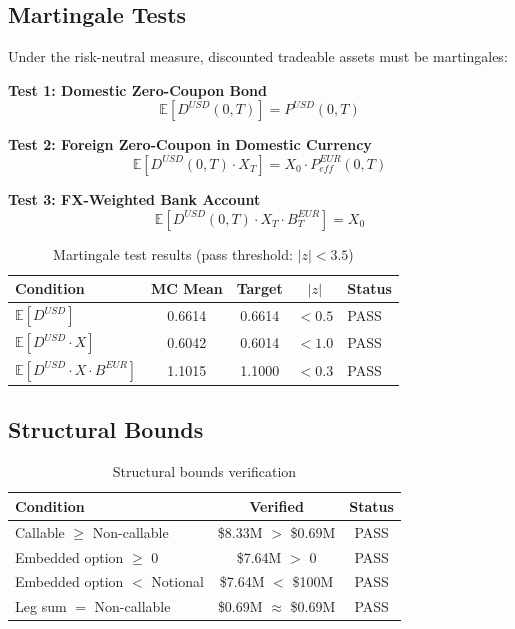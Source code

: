 \documentclass[10pt,a4paper]{article}
\begin{document}
\subsection{Martingale Tests}

Under the risk-neutral measure, discounted tradeable assets must be martingales:

\textbf{Test 1: Domestic Zero-Coupon Bond}
\[
\mathbb{E}[D^{USD}(0,T)] = P^{USD}(0,T)
\]

\textbf{Test 2: Foreign Zero-Coupon in Domestic Currency}
\[
\mathbb{E}[D^{USD}(0,T) \cdot X_T] = X_0 \cdot P^{EUR}_{eff}(0,T)
\]

\textbf{Test 3: FX-Weighted Bank Account}
\[
\mathbb{E}[D^{USD}(0,T) \cdot X_T \cdot B^{EUR}_T] = X_0
\]

\begin{table}[H]
\centering
\begin{tabular}{lcccl}
\toprule
\textbf{Condition} & \textbf{MC Mean} & \textbf{Target} & $|z|$ & \textbf{Status} \\
\midrule
$\mathbb{E}[D^{USD}]$ & 0.6614 & 0.6614 & $<0.5$ & PASS \\
$\mathbb{E}[D^{USD} \cdot X]$ & 0.6042 & 0.6014 & $<1.0$ & PASS \\
$\mathbb{E}[D^{USD} \cdot X \cdot B^{EUR}]$ & 1.1015 & 1.1000 & $<0.3$ & PASS \\
\bottomrule
\end{tabular}
\caption{Martingale test results (pass threshold: $|z| < 3.5$)}
\end{table}

\subsection{Structural Bounds}

\begin{table}[H]
\centering
\begin{tabular}{lcc}
\toprule
\textbf{Condition} & \textbf{Verified} & \textbf{Status} \\
\midrule
Callable $\geq$ Non-callable & \$8.33M $>$ \$0.69M & PASS \\
Embedded option $\geq$ 0 & \$7.64M $>$ 0 & PASS \\
Embedded option $<$ Notional & \$7.64M $<$ \$100M & PASS \\
Leg sum $=$ Non-callable & \$0.69M $\approx$ \$0.69M & PASS \\
\bottomrule
\end{tabular}
\caption{Structural bounds verification}
\end{table}
\end{document}
